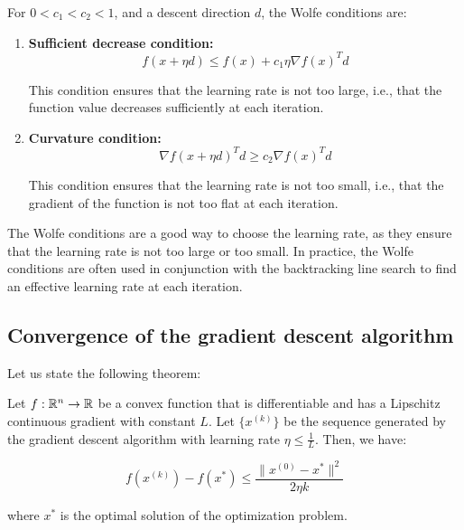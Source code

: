 For $0 < c_1 < c_2 < 1$, and a descent direction $d$, the Wolfe conditions are:

\begin{enumerate}
    \item \textbf{Sufficient decrease condition:}
    $$f(x + \eta d) \leq f(x) + c_1 \eta \nabla f(x)^T d$$

    This condition ensures that the learning rate is not too large, i.e., that the function value
    decreases sufficiently at each iteration.

    \item \textbf{Curvature condition:}
    $$\nabla f(x + \eta d)^T d \geq c_2 \nabla f(x)^T d$$

    This condition ensures that the learning rate is not too small, i.e., that the gradient of the
    function is not too flat at each iteration.
\end{enumerate}

The Wolfe conditions are a good way to choose the learning rate, as they ensure that the learning
rate is not too large or too small. In practice, the Wolfe conditions are often used in conjunction
with the backtracking line search to find an effective learning rate at each iteration.

\subsection{Convergence of the gradient descent algorithm}

Let us state the following theorem:

\begin{theorem}
    Let $f: \mathbb{R}^n \rightarrow \mathbb{R}$ be a convex function that is differentiable and has a Lipschitz
    continuous gradient with constant $L$. Let $\{ x^{(k)} \}$ be the sequence generated by the
    gradient descent algorithm with learning rate $\eta \leq \frac{1}{L}$. Then, we have:

    \begin{equation}
        f(x^{(k)}) - f(x^*) \leq \frac{\| x^{(0)} - x^* \|^2}{2 \eta k}
    \end{equation}

    where $x^*$ is the optimal solution of the optimization problem.
\end{theorem}

